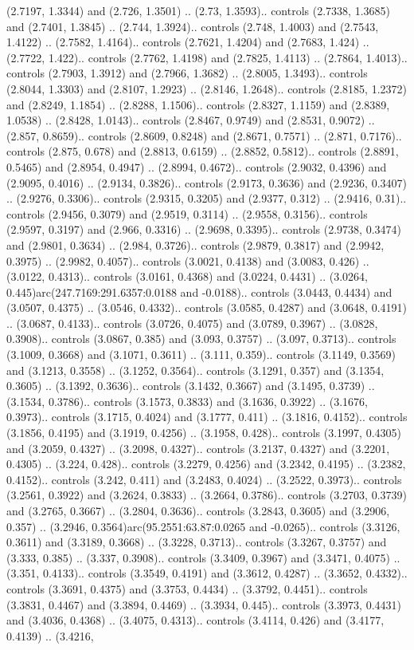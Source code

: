 (2.7197, 1.3344) and (2.726, 1.3501) .. (2.73, 1.3593).. controls (2.7338, 1.3685) and (2.7401, 1.3845) .. (2.744, 1.3924).. controls (2.748, 1.4003) and (2.7543, 1.4122) .. (2.7582, 1.4164).. controls (2.7621, 1.4204) and (2.7683, 1.424) .. (2.7722, 1.422).. controls (2.7762, 1.4198) and (2.7825, 1.4113) .. (2.7864, 1.4013).. controls (2.7903, 1.3912) and (2.7966, 1.3682) .. (2.8005, 1.3493).. controls (2.8044, 1.3303) and (2.8107, 1.2923) .. (2.8146, 1.2648).. controls (2.8185, 1.2372) and (2.8249, 1.1854) .. (2.8288, 1.1506).. controls (2.8327, 1.1159) and (2.8389, 1.0538) .. (2.8428, 1.0143).. controls (2.8467, 0.9749) and (2.8531, 0.9072) .. (2.857, 0.8659).. controls (2.8609, 0.8248) and (2.8671, 0.7571) .. (2.871, 0.7176).. controls (2.875, 0.678) and (2.8813, 0.6159) .. (2.8852, 0.5812).. controls (2.8891, 0.5465) and (2.8954, 0.4947) .. (2.8994, 0.4672).. controls (2.9032, 0.4396) and (2.9095, 0.4016) .. (2.9134, 0.3826).. controls (2.9173, 0.3636) and (2.9236, 0.3407) .. (2.9276, 0.3306).. controls (2.9315, 0.3205) and (2.9377, 0.312) .. (2.9416, 0.31).. controls (2.9456, 0.3079) and (2.9519, 0.3114) .. (2.9558, 0.3156).. controls (2.9597, 0.3197) and (2.966, 0.3316) .. (2.9698, 0.3395).. controls (2.9738, 0.3474) and (2.9801, 0.3634) .. (2.984, 0.3726).. controls (2.9879, 0.3817) and (2.9942, 0.3975) .. (2.9982, 0.4057).. controls (3.0021, 0.4138) and (3.0083, 0.426) .. (3.0122, 0.4313).. controls (3.0161, 0.4368) and (3.0224, 0.4431) .. (3.0264, 0.445)arc(247.7169:291.6357:0.0188 and -0.0188).. controls (3.0443, 0.4434) and (3.0507, 0.4375) .. (3.0546, 0.4332).. controls (3.0585, 0.4287) and (3.0648, 0.4191) .. (3.0687, 0.4133).. controls (3.0726, 0.4075) and (3.0789, 0.3967) .. (3.0828, 0.3908).. controls (3.0867, 0.385) and (3.093, 0.3757) .. (3.097, 0.3713).. controls (3.1009, 0.3668) and (3.1071, 0.3611) .. (3.111, 0.359).. controls (3.1149, 0.3569) and (3.1213, 0.3558) .. (3.1252, 0.3564).. controls (3.1291, 0.357) and (3.1354, 0.3605) .. (3.1392, 0.3636).. controls (3.1432, 0.3667) and (3.1495, 0.3739) .. (3.1534, 0.3786).. controls (3.1573, 0.3833) and (3.1636, 0.3922) .. (3.1676, 0.3973).. controls (3.1715, 0.4024) and (3.1777, 0.411) .. (3.1816, 0.4152).. controls (3.1856, 0.4195) and (3.1919, 0.4256) .. (3.1958, 0.428).. controls (3.1997, 0.4305) and (3.2059, 0.4327) .. (3.2098, 0.4327).. controls (3.2137, 0.4327) and (3.2201, 0.4305) .. (3.224, 0.428).. controls (3.2279, 0.4256) and (3.2342, 0.4195) .. (3.2382, 0.4152).. controls (3.242, 0.411) and (3.2483, 0.4024) .. (3.2522, 0.3973).. controls (3.2561, 0.3922) and (3.2624, 0.3833) .. (3.2664, 0.3786).. controls (3.2703, 0.3739) and (3.2765, 0.3667) .. (3.2804, 0.3636).. controls (3.2843, 0.3605) and (3.2906, 0.357) .. (3.2946, 0.3564)arc(95.2551:63.87:0.0265 and -0.0265).. controls (3.3126, 0.3611) and (3.3189, 0.3668) .. (3.3228, 0.3713).. controls (3.3267, 0.3757) and (3.333, 0.385) .. (3.337, 0.3908).. controls (3.3409, 0.3967) and (3.3471, 0.4075) .. (3.351, 0.4133).. controls (3.3549, 0.4191) and (3.3612, 0.4287) .. (3.3652, 0.4332).. controls (3.3691, 0.4375) and (3.3753, 0.4434) .. (3.3792, 0.4451).. controls (3.3831, 0.4467) and (3.3894, 0.4469) .. (3.3934, 0.445).. controls (3.3973, 0.4431) and (3.4036, 0.4368) .. (3.4075, 0.4313).. controls (3.4114, 0.426) and (3.4177, 0.4139) .. (3.4216, 